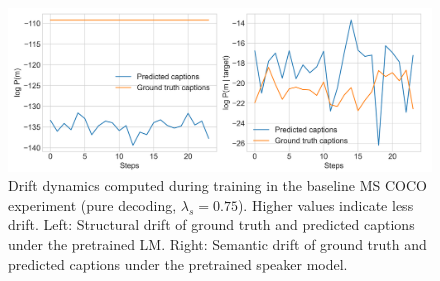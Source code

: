 \begin{figure}[h]
	\centering
	\includegraphics[width=\linewidth]{images/coco_structural_semantic_drift_4000_pure_075_random.png}
	\caption{Drift dynamics computed during training in the baseline MS COCO experiment (pure decoding, $\lambda_s = 0.75$). Higher values indicate less drift. Left: Structural drift of ground truth and predicted captions under the pretrained LM. Right: Semantic drift of ground truth and predicted captions under the pretrained speaker model.\protect\footnotemark}
	\label{fig:coco_baseline_075_str_drift}
\end{figure}

